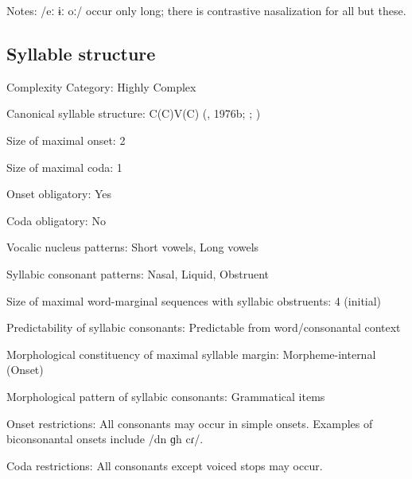 {\begin{appendixdesc}
\item[Notes:] /eː ɨː oː/ occur only long; there is contrastive nasalization for all but these.
\end{appendixdesc}
\subsection*{Syllable structure}
\begin{appendixdesc}

\item[Complexity Category:] Highly Complex 

\item[Canonical syllable structure:] C(C)V(C) (\citealt{Diffloth1976a}, 1976b; \citealt{Sloan1988}; \citealt{Philips2007})

\item[Size of maximal onset:] 2

\item[Size of maximal coda:] 1

\item[Onset obligatory:] Yes

\item[Coda obligatory:] No

\item[Vocalic nucleus patterns:] Short vowels, Long vowels

\item[Syllabic consonant patterns:] Nasal, Liquid, Obstruent

\item[Size of maximal word-marginal sequences with syllabic obstruents:] 4 (initial)

\item[Predictability of syllabic consonants:] Predictable from word/consonantal context

\item[Morphological constituency of maximal syllable margin:] Morpheme-internal (Onset)

\item[Morphological pattern of syllabic consonants:] Grammatical items

\item[Onset restrictions:] All consonants may occur in simple onsets. Examples of biconsonantal onsets include /dn ɡh cɾ/.

\item[Coda restrictions:] All consonants except voiced stops may occur.


\end{appendixdesc}}
